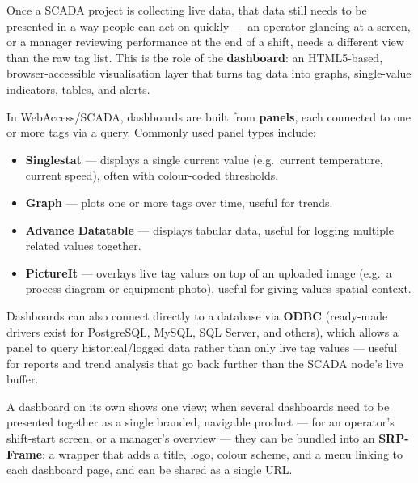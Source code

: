 \begin{introduction}
  Once a SCADA project is collecting live data, that data still needs to be presented in a way people can act on quickly --- an operator glancing at a screen, or a manager reviewing performance at the end of a shift, needs a different view than the raw tag list. This is the role of the \textbf{dashboard}: an HTML5-based, browser-accessible visualisation layer that turns tag data into graphs, single-value indicators, tables, and alerts.
  \vspace*{1.5em}

  In WebAccess/SCADA, dashboards are built from \textbf{panels}, each connected to one or more tags via a query. Commonly used panel types include:
  \begin{itemize}
    \item \textbf{Singlestat} --- displays a single current value (e.g.\ current temperature, current speed), often with colour-coded thresholds.
    \item \textbf{Graph} --- plots one or more tags over time, useful for trends.
    \item \textbf{Advance Datatable} --- displays tabular data, useful for logging multiple related values together.
    \item \textbf{PictureIt} --- overlays live tag values on top of an uploaded image (e.g.\ a process diagram or equipment photo), useful for giving values spatial context.
  \end{itemize}
  \vspace*{1.5em}

  Dashboards can also connect directly to a database via \textbf{ODBC} (ready-made drivers exist for PostgreSQL, MySQL, SQL Server, and others), which allows a panel to query historical/logged data rather than only live tag values --- useful for reports and trend analysis that go back further than the SCADA node's live buffer.
  \vspace*{1.5em}

  A dashboard on its own shows one view; when several dashboards need to be presented together as a single branded, navigable product --- for an operator's shift-start screen, or a manager's overview --- they can be bundled into an \textbf{SRP-Frame}: a wrapper that adds a title, logo, colour scheme, and a menu linking to each dashboard page, and can be shared as a single URL.
\end{introduction}

